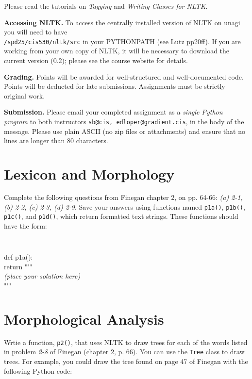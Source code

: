 \documentclass{cis530}
\begin{document}
\maketitle

Please read the tutorials on \emph{Tagging} and \emph{Writing Classes
for NLTK}.

{\bf Accessing NLTK.}  
To access the centrally installed version of NLTK on unagi you will
need to have\\ \texttt{/spd25/cis530/nltk/src} in your PYTHONPATH (see
Lutz pp20ff).  If you are working from your own copy of NLTK, it will
be necessary to download the current version (0.2); please see the
course website for details.

{\bf Grading.}  
Points will be awarded for well-structured and well-documented code.
Points will be deducted for late submissions.  Assignments must be
strictly original work.

{\bf Submission.}  
Please email your completed assignment as a
\emph{single Python program} to both instructors
\texttt{sb@cis, edloper@gradient.cis}, in the body of the message.
Please use plain ASCII (no zip files or attachments) and ensure
that no lines are longer than 80 characters.

\section{Lexicon and Morphology}

Complete the following questions from Finegan chapter 2, on pp. 64-66:
\emph{(a) 2-1, (b) 2-2, (c) 2-3, (d) 2-9}.  
Save your answers using functions named
\texttt{p1a()}, \texttt{p1b()}, \texttt{p1c()}, and \texttt{p1d()}, which
return formatted text strings.  These functions should have the form:

{\tt
\begin{tabbing}
def p1a():\\
\qquad return """\\
\textit{(place your solution here)}\\
"""
\end{tabbing}
}

\section{Morphological Analysis}

Wrtie a function, \texttt{p2()}, that uses NLTK to draw trees for each
of the words listed in problem \emph{2-8} of Finegan (chapter 2,
p. 66).  You can use the \texttt{Tree} class to draw trees.  For
example, you could draw the tree found on page 47 of Finegan with the
following Python code:
\end{document}
